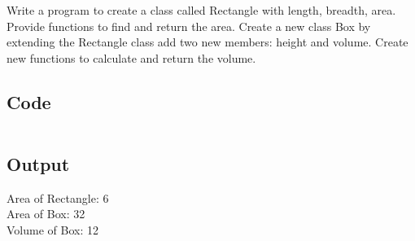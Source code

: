 \documentclass[../main.tex]{subfiles}
\begin{document}
Write a program to create a class called Rectangle with length, breadth, area.
Provide functions to find and return the area. Create a new class Box by
extending the Rectangle class add two new members: height and volume. Create
new functions to calculate and return the volume.

\subsection{Code}
\inputminted[frame=lines, breaklines, breakanywhere, numberblanklines=false]{java}{./programs/prog6/Box.java}

\subsection{Output}
Area of Rectangle: 6 \\
Area of Box: 32 \\
Volume of Box: 12 \\
\end{document}
